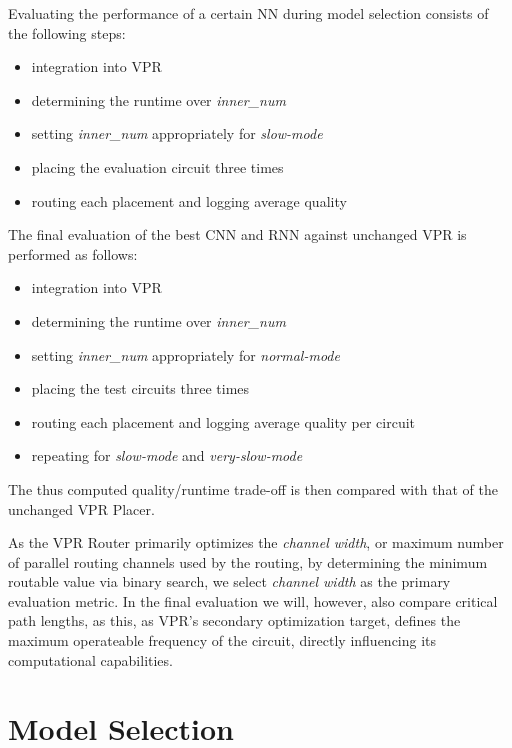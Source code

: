 Evaluating the performance of a certain \gls{NN} during model selection consists of the following steps:

\begin{itemize}
	\item integration into \gls{VPR}
	\item determining the runtime over \textit{inner\_num}
	\item setting \textit{inner\_num} appropriately for \textit{slow-mode}
	\item placing the evaluation circuit three times
	\item routing each placement and logging average quality 
\end{itemize}

The final evaluation of the best \gls{CNN} and \gls{RNN} against unchanged \gls{VPR} is performed as follows:

\begin{itemize}
	\item integration into \gls{VPR}
	\item determining the runtime over \textit{inner\_num}
	\item setting \textit{inner\_num} appropriately for \textit{normal-mode}
	\item placing the test circuits three times
	\item routing each placement and logging average quality per circuit
	\item repeating for \textit{slow-mode} and \textit{very-slow-mode}
\end{itemize}

The thus computed quality/runtime trade-off is then compared with that of the unchanged \gls{VPR} Placer.

As the \gls{VPR} Router primarily optimizes the \textit{channel width}, or maximum number of parallel routing channels used by the routing, by determining the minimum routable value via binary search, we select \textit{channel width} as the primary evaluation metric. In the final evaluation we will, however, also compare critical path lengths, as this, as \gls{VPR}'s secondary optimization target, defines the maximum operateable frequency of the circuit, directly influencing its computational capabilities.

\section{Model Selection}\label{ch:model-selection}


